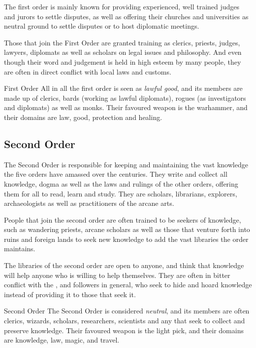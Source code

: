 The first order is mainly known for providing experienced, well trained judges
and jurors to settle disputes, as well as offering their churches and
universities as neutral ground to settle disputes or to host diplomatic
meetings.

Those that join the First Order are granted training as clerics, priests,
judges, lawyers, diplomats as well as scholars on legal issues and
philosophy. And even though their word and judgement is held in high esteem by
many people, they are often in direct conflict with local laws and customs.

\begin{35e}{First Order}
  All in all the first order is seen as \emph{lawful good}, and its members
  are made up of clerics, bards (working as lawful diplomats), rogues (as
  investigators and diplomats) as well as monks. Their favoured weapon is the
  warhammer, and their domains are law, good, protection and healing.
\end{35e}

\subsection{Second Order}
\label{sec:Second Order}

The Second Order is responsible for keeping and maintaining the vast knowledge
the five orders have amassed over the centuries. They write and collect all
knowledge, dogma as well as the laws and rulings of the other orders, offering
them for all to read, learn and study. They are scholars, librarians,
explorers, archaeologists as well as practitioners of the arcane arts.

People that join the second order are often trained to be seekers of
knowledge, such as wandering priests, arcane scholars as well as those that
venture forth into ruins and foreign lands to seek new knowledge to add the
vast libraries the order maintains.

The libraries of the second order are open to anyone, and think that knowledge
will help anyone who is willing to help themselves. They are often in bitter
conflict with the , and 
followers in general, who seek to hide and hoard knowledge instead of
providing it to those that seek it.

\begin{35e}{Second Order}
  The Second Order is considered \emph{neutral}, and its members are often
  clerics, wizards, scholars, researchers, scientists and any that seek to
  collect and preserve knowledge. Their favoured weapon is the light pick,
  and their domains are knowledge, law, magic, and travel.
\end{35e}

